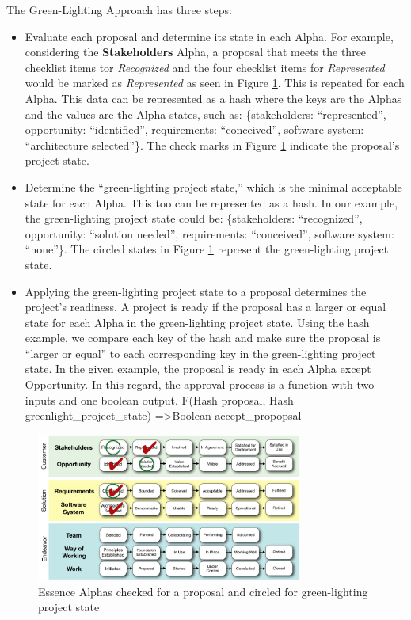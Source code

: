 The Green-Lighting Approach has three steps:

\begin{itemize}
\itemsep1pt\parskip0pt
\item
  Evaluate each proposal and determine its state in each Alpha. For
  example, considering the  \textbf{Stakeholders} Alpha, a proposal that meets the three checklist items tor \textit{Recognized}
  and the four checklist items for \textit{Represented} would be marked as \textit{Represented} as seen in Figure
  \ref{EssenceAlpha}. This is repeated for each Alpha.
  This data can be represented as a hash where the keys are the Alphas
  and the values are the Alpha states, such as: \{stakeholders:
  ``represented'', opportunity: ``identified'', requirements:
  ``conceived'', software system: ``architecture selected''\}. The check marks in Figure
  \ref{EssenceAlpha} indicate the proposal's project
  state.
\item
  Determine the ``green-lighting project state,'' which is the minimal
  acceptable state for each Alpha. This too can be represented as a
  hash. In our example, the green-lighting project state could be:
  \{stakeholders: ``recognized'', opportunity: ``solution needed'',
  requirements: ``conceived'', software system: ``none''\}. The circled
  states in Figure \ref{EssenceAlpha} represent the
  green-lighting project state.
\item
  Applying the green-lighting project state to a proposal determines
  the project's readiness. A project is ready if the proposal has a
  larger or equal state for each Alpha in the green-lighting project
  state. Using the hash example, we compare each key of the hash and
  make sure the proposal is ``larger or equal'' to each corresponding
  key in the green-lighting project state. In the given example, the
  proposal is ready in each Alpha except Opportunity. In this regard, the approval process
  is a function with two inputs and one boolean output. F(Hash proposal,
  Hash greenlight\_project\_state) =\textgreater Boolean
  accept\_propopsal
\end{itemize}



\begin{figure}[!t]
\centering
\includegraphics[width=3.45in]{essence_green_lighting_images/EssenceAlpha.png}
\caption{Essence Alphas checked for a proposal and circled for
green-lighting project state}
\label{EssenceAlpha}
\end{figure}

